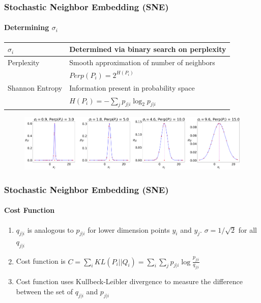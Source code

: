 \documentclass{beamer}
\begin{document}
\begin{frame}
  \frametitle{Stochastic Neighbor Embedding (SNE)}
  \framesubtitle{Determining $\sigma_i$}

  \begin{center}
    \small
    
    \begin{tabular}{ll}
      $\sigma_i$ & Determined via binary search on perplexity\\
      \hline
      Perplexity & Smooth approximation of number of neighbors\\
      & $Perp(P_i) = 2^{H(P_i)}$\\
      \hline
      Shannon Entropy & Information present in probability space\\
      & $H(P_i) = -\sum_j p_{j|i} \log_2{p_{j|i}}$\\
    \end{tabular}
  \end{center}

  
  \begin{figure}
    \centering
    \includegraphics[width=\textwidth]{images/perp/perp.png}
  \end{figure}
\end{frame}

\begin{frame}
  \frametitle{Stochastic Neighbor Embedding (SNE)}
  \framesubtitle{Cost Function}

  \begin{enumerate}
  \item $q_{j|i}$ is analogous to $p_{j|i}$ for lower dimension points $y_i$ and $y_j$.
    $\sigma = 1/\sqrt{2}$ for all $q_{j|i}$

  \item Cost function is $C = \sum_i KL(P_i || Q_i) = \sum_i \sum_j p_{j|i} \log\frac{p_{j|i}}{q_{j|i}}$

  \item Cost function uses Kullbeck-Leibler divergence to measure the
    difference between the set of $q_{j|i}$ and $p_{j|i}$
  \end{enumerate}
\end{frame}
\end{document}

